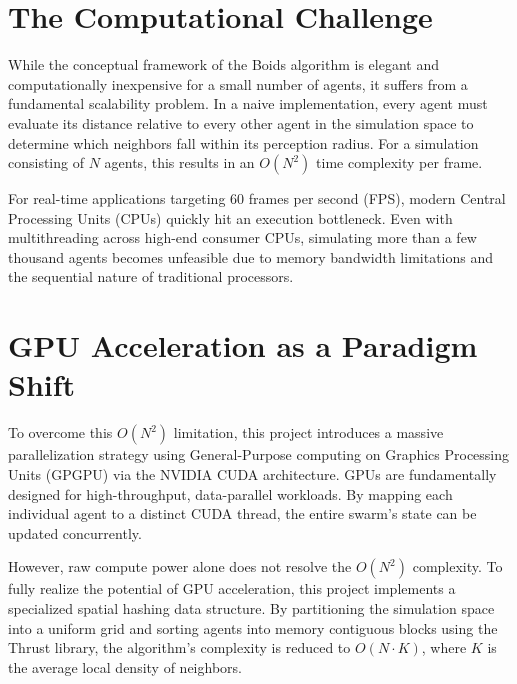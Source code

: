 \documentclass[12pt,a4paper]{report}
\begin{document}
\section{The Computational Challenge}
While the conceptual framework of the Boids algorithm is elegant and computationally inexpensive for a small number of agents, it suffers from a fundamental scalability problem. In a naive implementation, every agent must evaluate its distance relative to every other agent in the simulation space to determine which neighbors fall within its perception radius. For a simulation consisting of $N$ agents, this results in an $O(N^2)$ time complexity per frame. 

For real-time applications targeting 60 frames per second (FPS), modern Central Processing Units (CPUs) quickly hit an execution bottleneck. Even with multithreading across high-end consumer CPUs, simulating more than a few thousand agents becomes unfeasible due to memory bandwidth limitations and the sequential nature of traditional processors. 

\section{GPU Acceleration as a Paradigm Shift}
To overcome this $O(N^2)$ limitation, this project introduces a massive parallelization strategy using General-Purpose computing on Graphics Processing Units (GPGPU) via the NVIDIA CUDA architecture. GPUs are fundamentally designed for high-throughput, data-parallel workloads. By mapping each individual agent to a distinct CUDA thread, the entire swarm's state can be updated concurrently. 

However, raw compute power alone does not resolve the $O(N^2)$ complexity. To fully realize the potential of GPU acceleration, this project implements a specialized spatial hashing data structure. By partitioning the simulation space into a uniform grid and sorting agents into memory contiguous blocks using the Thrust library, the algorithm's complexity is reduced to $O(N \cdot K)$, where $K$ is the average local density of neighbors.
\end{document}
